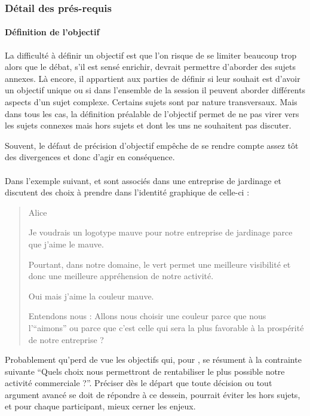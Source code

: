 \subsubsection{Détail des prés-requis}
\paragraph{Définition de l’objectif}
La difficulté à définir un objectif est que l’on risque de se limiter beaucoup trop alors que le débat, s’il est sensé enrichir, devrait permettre d’aborder des sujets annexes. Là encore, il appartient aux parties de définir si leur souhait est d’avoir un objectif unique ou si dans l’ensemble de la session il peuvent aborder différents aspects d’un sujet complexe. Certains sujets sont par nature transversaux. Mais dans tous les cas, la définition préalable de l’objectif permet de ne pas virer vers les sujets connexes mais hors sujets et dont les uns ne souhaitent pas discuter.

Souvent, le défaut de précision d’objectif empêche de se rendre compte assez tôt des divergences et donc d’agir en conséquence.

\paragraph{}
Dans l’exemple suivant, \A et \B sont associés dans une entreprise de jardinage et discutent des choix à prendre dans l’identité graphique de celle-ci :

\begin{quote}
  \begin{drama}{0cm}{0cm}{Alice}

    \Aspeaks Je voudrais un logotype mauve pour notre entreprise de jardinage parce que j’aime le mauve.

    \Bspeaks Pourtant, dans notre domaine, le vert permet une meilleure visibilité et donc une meilleure appréhension de notre activité.

    \Aspeaks Oui mais j’aime la couleur mauve.

    \Bspeaks Entendons nous : Allons nous choisir une couleur parce que nous l’\enquote{aimons} ou parce que c’est celle qui sera la plus favorable à la prospérité de notre entreprise ?

  \end{drama}
\end{quote}

Probablement qu’\A perd de vue les objectifs qui, pour \B, se résument à la contrainte suivante \enquote{Quels choix nous permettront de rentabiliser le plus possible notre activité commerciale ?}. Préciser dès le départ que toute décision ou tout argument avancé se doit de répondre à ce dessein, pourrait éviter les hors sujets, et pour chaque participant, mieux cerner les enjeux.

